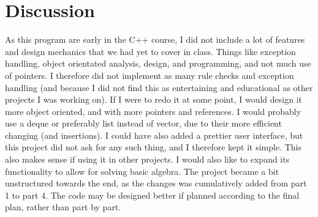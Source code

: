 \documentclass{article}
\begin{document}
	
	\section{Discussion}
		As this program are early in the C++ course, I did not include a lot of features and design mechanics that we had yet to cover in class. Things like exception handling, object orientated analysis, design, and programming, and not much use of pointers.
		I therefore did not implement as many rule checks and exception handling (and because I did not find this as entertaining and educational as other projects I was working on). If I were to redo it at some point, I would design it more object oriented, and with more pointers and references. I would probably use a deque or preferably list instead of vector, due to their more efficient changing (and insertions).
		I could have also added a prettier user interface, but this project did not ask for any such thing, and I therefore kept it simple. This also makes sense if using it in other projects. I would also like to expand its functionality to allow for solving basic algebra.
		The project became a bit unstructured towards the end, as the changes was cumulatively added from part 1 to part 4. The code may be designed better if planned according to the final plan, rather than part by part.
		
	
	
	\clearpage
	
	
	
\end{document}
